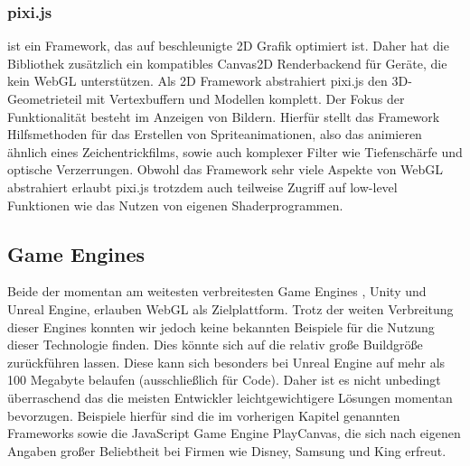 \subsubsection*{pixi.js} ist ein Framework, das auf beschleunigte 2D Grafik optimiert ist. Daher hat die Bibliothek zusätzlich ein kompatibles Canvas2D Renderbackend für Geräte, die kein WebGL unterstützen. Als 2D Framework abstrahiert pixi.js den 3D-Geometrieteil mit Vertexbuffern und Modellen komplett. Der Fokus der Funktionalität besteht im Anzeigen von Bildern. Hierfür stellt das Framework Hilfsmethoden für das Erstellen von Spriteanimationen, also das animieren ähnlich eines Zeichentrickfilms, sowie auch komplexer Filter wie Tiefenschärfe und optische Verzerrungen. Obwohl das Framework sehr viele Aspekte von WebGL abstrahiert erlaubt pixi.js trotzdem auch teilweise Zugriff auf low-level Funktionen wie das Nutzen von eigenen Shaderprogrammen.
\subsection{Game Engines}
Beide der momentan am weitesten verbreitesten Game Engines \cite{UnityDist}\cite{EngineDist}, Unity und Unreal Engine, erlauben WebGL als Zielplattform. Trotz der weiten Verbreitung dieser Engines konnten wir jedoch keine bekannten Beispiele für die Nutzung dieser Technologie finden. Dies könnte sich auf die relativ große Buildgröße zurückführen lassen. Diese kann sich besonders bei Unreal Engine auf mehr als 100 Megabyte belaufen (ausschließlich für Code). Daher ist es nicht unbedingt überraschend das die meisten Entwickler leichtgewichtigere Lösungen momentan bevorzugen. Beispiele hierfür sind die im vorherigen Kapitel genannten Frameworks sowie die JavaScript Game Engine PlayCanvas, die sich nach eigenen Angaben großer Beliebtheit bei Firmen wie Disney, Samsung und King erfreut.
